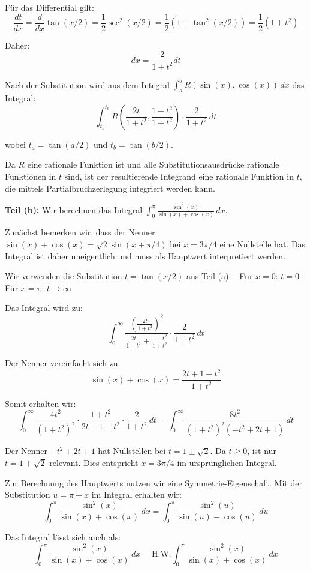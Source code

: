 \documentclass{article}
\begin{document}
Für das Differential gilt:
$$\frac{dt}{dx} = \frac{d}{dx}\tan(x/2) = \frac{1}{2}\sec^2(x/2) = \frac{1}{2}(1 + \tan^2(x/2)) = \frac{1}{2}(1 + t^2)$$

Daher:
$$dx = \frac{2}{1 + t^2}dt$$

Nach der Substitution wird aus dem Integral $\int_a^b R(\sin(x), \cos(x))\,dx$ das Integral:
$$\int_{t_a}^{t_b} R\left(\frac{2t}{1+t^2}, \frac{1-t^2}{1+t^2}\right) \cdot \frac{2}{1+t^2}\,dt$$

wobei $t_a = \tan(a/2)$ und $t_b = \tan(b/2)$.

Da $R$ eine rationale Funktion ist und alle Substitutionsausdrücke rationale Funktionen in $t$ sind, ist der resultierende Integrand eine rationale Funktion in $t$, die mittels Partialbruchzerlegung integriert werden kann.

\textbf{Teil (b):} Wir berechnen das Integral $\int_0^\pi \frac{\sin^2(x)}{\sin(x)+\cos(x)}\,dx$.

Zunächst bemerken wir, dass der Nenner $\sin(x) + \cos(x) = \sqrt{2}\sin(x + \pi/4)$ bei $x = 3\pi/4$ eine Nullstelle hat. Das Integral ist daher uneigentlich und muss als Hauptwert interpretiert werden.

Wir verwenden die Substitution $t = \tan(x/2)$ aus Teil (a):
- Für $x = 0$: $t = 0$
- Für $x = \pi$: $t \to \infty$

Das Integral wird zu:
$$\int_0^\infty \frac{\left(\frac{2t}{1+t^2}\right)^2}{\frac{2t}{1+t^2} + \frac{1-t^2}{1+t^2}} \cdot \frac{2}{1+t^2}\,dt$$

Der Nenner vereinfacht sich zu:
$$\sin(x) + \cos(x) = \frac{2t + 1 - t^2}{1 + t^2}$$

Somit erhalten wir:
$$\int_0^\infty \frac{4t^2}{(1+t^2)^2} \cdot \frac{1+t^2}{2t + 1 - t^2} \cdot \frac{2}{1+t^2}\,dt = \int_0^\infty \frac{8t^2}{(1+t^2)^2(-t^2 + 2t + 1)}\,dt$$

Der Nenner $-t^2 + 2t + 1$ hat Nullstellen bei $t = 1 \pm \sqrt{2}$. Da $t \geq 0$, ist nur $t = 1 + \sqrt{2}$ relevant. Dies entspricht $x = 3\pi/4$ im ursprünglichen Integral.

Zur Berechnung des Hauptwerts nutzen wir eine Symmetrie-Eigenschaft. Mit der Substitution $u = \pi - x$ im Integral erhalten wir:
$$\int_0^\pi \frac{\sin^2(x)}{\sin(x)+\cos(x)}\,dx = \int_0^\pi \frac{\sin^2(u)}{\sin(u)-\cos(u)}\,du$$

Das Integral lässt sich auch als:
$$\int_0^\pi \frac{\sin^2(x)}{\sin(x)+\cos(x)}\,dx = \text{H.W.} \int_0^\pi \frac{\sin^2(x)}{\sin(x)+\cos(x)}\,dx$$
\end{document}
